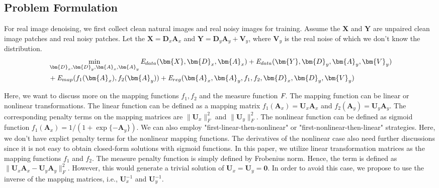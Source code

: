 \documentclass[10pt,twocolumn,letterpaper]{article}
\begin{document}
\subsection{Problem Formulation}
For real image denoising, we first collect clean natural images and real noisy images for training. Assume the $\bm{X}$ and $\bm{Y}$ are unpaired clean image patches and real noisy patches. Let the $\bm{X} = \bm{D}_{x}\bm{A}_{x}$ and $\bm{Y} = \bm{D}_{y}\bm{A}_{y}+\bm{V}_{y}$, where $\bm{V}_{y}$ is the real noise of which we don't know the distribution. 
\begin{equation}
\begin{split}
&\min_{\bm{D}_{x},\bm{D}_{y},\bm{A}_{x},\bm{A}_{y}}
\emph{E}_{data}(\bm{X},\bm{D}_{x},\bm{A}_{x})+
\emph{E}_{data}(\bm{Y},\bm{D}_{y},\bm{A}_{y},\bm{V}_{y})
\\
&
+\emph{E}_{map}(f_{1}(\bm{A}_{x}),f_{2}(\bm{A}_{y}))+
\emph{E}_{reg}(\bm{A}_{x},\bm{A}_{y},f_{1},f_{2},\bm{D}_{x},\bm{D}_{y},\bm{V}_{y})
\end{split}
\end{equation}


Here, we want to discuss more on the mapping functions $f_{1}, f_{2}$ and the measure function $\emph{F}$. The mapping function can be linear or nonlinear transformations. The linear function can be defined as a mapping matrix $f_{1}(\bm{A}_{x})=\bm{U}_{x}\bm{A}_{x}$ and $f_{2}(\bm{A}_{y})=\bm{U}_{y}\bm{A}_{y}$. The corresponding penalty terms on the mapping matrices are $\|\bm{U}_{x}\|_{F}^{2}$ and $\|\bm{U}_{y}\|_{F}^{2}$. The nonlinear function can be defined as sigmoid function $f_{1}(\bm{A}_{x})=1/(1+\exp\{-\bm{A}_{y}\})$. We can also employ "first-linear-then-nonlinear" or "first-nonlinear-then-linear" strategies. Here, we don't have explict penalty terms for the nonlinear mapping functions. The derivatives of the nonlinear case also need further discussions since it is not easy to obtain closed-form solutions with sigmoid functions. In this paper, we utilize linear transformation matrices as the mapping functions $f_{1}$ and $f_{2}$. The measure penalty function is simply defined by Frobenius norm. Hence, the term is defined as $\|\bm{U}_{x}\bm{A}_{x}-\bm{U}_{y}\bm{A}_{y}\|_{F}^{2}$. However, this would generate a trivial solution of $\bm{U}_{x}=\bm{U}_{y}=\bm{0}$. In order to avoid this case, we propose to use the inverse of the mapping matrices, i.e., $\bm{U}_{x}^{-1}$ and $\bm{U}_{y}^{-1}$.
\end{document}
